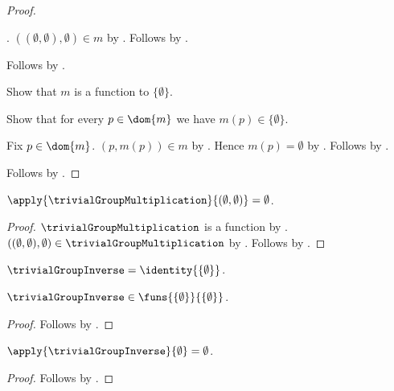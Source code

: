\begin{proof}
\begin{subproof}
\begin{subproof}
                .
            $((\emptyset,\emptyset),\emptyset)\in m$ by
                .
            Follows by .
        \end{subproof}
        Follows by .
    \end{subproof}
    Show that $m$ is a function to $\{\emptyset\}$.
    \begin{subproof}
        Show that for every $p\in\dom{m}$ we have
            $m(p)\in\{\emptyset\}$.
        \begin{subproof}
            Fix $p\in\dom{m}$.
            $(p,m(p))\in m$ by .
            Hence $m(p)=\emptyset$ by
                .
            Follows by .
        \end{subproof}
    \end{subproof}
    Follows by .
\end{proof}

\begin{proposition}\label{trivial_group_multiplication_apply}
    $\apply{\trivialGroupMultiplication}{(\emptyset,\emptyset)}
        =\emptyset$.
\end{proposition}
\begin{proof}
    $\trivialGroupMultiplication$ is a function by
        .
    $((\emptyset,\emptyset),\emptyset)
        \in\trivialGroupMultiplication$ by
        .
    Follows by .
\end{proof}

\begin{definition}\label{trivial_group_inverse}
    $\trivialGroupInverse=\identity{\{\emptyset\}}$.
\end{definition}

\begin{proposition}\label{trivial_group_inverse_type}
    $\trivialGroupInverse\in
        \funs{\{\emptyset\}}{\{\emptyset\}}$.
\end{proposition}
\begin{proof}
    Follows by .
\end{proof}

\begin{proposition}\label{trivial_group_inverse_apply}
    $\apply{\trivialGroupInverse}{\emptyset}=\emptyset$.
\end{proposition}
\begin{proof}
    Follows by .
\end{proof}

